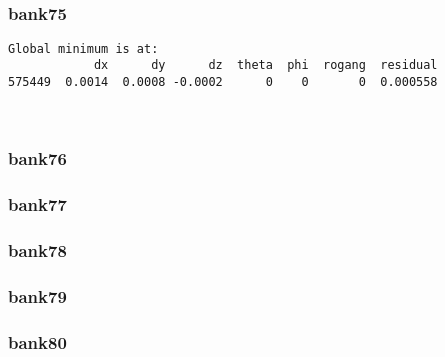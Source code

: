 \documentclass[11pt]{article}
\begin{document}
    \begin{center}
    \end{center}
    { \hspace*{\fill} \\}
    
    \hypertarget{bank75}{%
\subsubsection{bank75}\label{bank75}}

    \begin{Verbatim}[commandchars=\\\{\}]
Global minimum is at:
            dx      dy      dz  theta  phi  rogang  residual
575449  0.0014  0.0008 -0.0002      0    0       0  0.000558
    \end{Verbatim}

    \begin{center}
    \end{center}
    { \hspace*{\fill} \\}
    
    \hypertarget{bank76}{%
\subsubsection{bank76}\label{bank76}}

    \hypertarget{bank77}{%
\subsubsection{bank77}\label{bank77}}

    \hypertarget{bank78}{%
\subsubsection{bank78}\label{bank78}}

    \hypertarget{bank79}{%
\subsubsection{bank79}\label{bank79}}

    \hypertarget{bank80}{%
\subsubsection{bank80}\label{bank80}}
\end{document}
